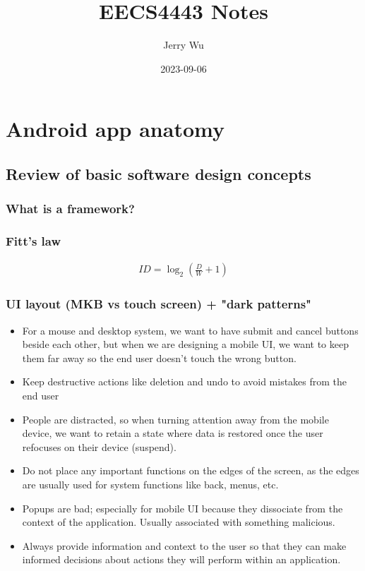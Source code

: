 \documentclass[12pt]{book}
\title{EECS4443 Notes}
\author{Jerry Wu}
\date{2023-09-06}
\begin{document}
\maketitle

\chapter*{Android app anatomy}

\section*{Review of basic software design concepts}

\subsection*{What is a framework?}

\subsection*{Fitt's law}

\begin{align*}
    ID=\log_2\left(\frac{D}{W} + 1\right)
\end{align*}

\subsection*{UI layout (MKB vs touch screen) + "dark patterns"}

\begin{itemize}
  \item For a mouse and desktop system, we want to have submit and cancel buttons beside each other, but when we are designing a mobile UI, we want to keep them far away so the end user doesn't touch the wrong button.
  \item Keep destructive actions like deletion and undo to avoid mistakes from the end user
  \item People are distracted, so when turning attention away from the mobile device, we want to retain a state where data is restored once the user refocuses on their device (suspend).
  \item Do not place any important functions on the edges of the screen, as the edges are usually used for system functions like back, menus, etc.
  \item Popups are bad; especially for mobile UI because they dissociate from the context of the application. Usually associated with something malicious.
  \item Always provide information and context to the user so that they can make informed decisions about actions they will perform within an application.
\end{itemize}
\end{document}
